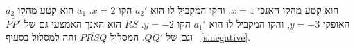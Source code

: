 $a_2$
הוא קטע מהקו האנכי 
$x=1$,
והקו המקביל לו הוא
$a_2'$
הקו
$x=2$.
$a_1$
הוא קטע מהקו האופקי 
$y=-3$,
והקו המקביל לו הוא
$a_1'$
הקו
$y=-2$.
$RS$
הוא האנך האמצעי גם של
$\overline{PP'}$
וגם של
$\overline{QQ'}$.
המסלול
$\overline{PRSQ}$
זהה למסלול בסעיף%
~\ref{s.negative}.
%
%
%
%
%
%
%

